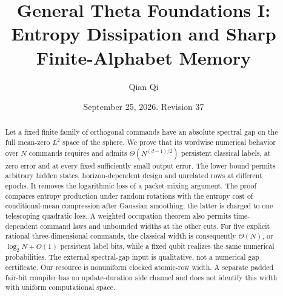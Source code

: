 \documentclass[11pt]{amsart}
\title[Entropy dissipation and finite-alphabet memory]{General Theta Foundations I:\\
Entropy Dissipation and Sharp Finite-Alphabet Memory}
\author{Qian Qi}
\date{September 25, 2026. Revision 37}
\theoremstyle{definition}\newtheorem{definition}[theorem]{Definition}
\theoremstyle{remark}\newtheorem{remark}[theorem]{Remark}
\begin{document}
\begin{abstract}
Let a fixed finite family of orthogonal commands have an absolute spectral
gap on the full mean-zero $L^2$ space of the sphere. We prove that its
wordwise numerical behavior over $N$ commands requires and admits
$\Theta(N^{(d-1)/2})$ persistent classical labels, at zero error and at
every fixed sufficiently small output error. The lower bound permits
arbitrary hidden states, horizon-dependent design and unrelated rows at
different epochs. It removes the logarithmic loss of a packet-mixing
argument. The proof compares entropy production under random rotations
with the entropy cost of conditional-mean compression after Gaussian
smoothing; the latter is charged to one telescoping quadratic loss.
A weighted occupation theorem also permits time-dependent command laws
and unbounded widths at the other cuts. For five explicit rational
three-dimensional commands, the classical width is consequently
$\Theta(N)$, or $\log_2N+O(1)$ persistent label bits, while a fixed qubit
realizes the same numerical probabilities. The external spectral-gap
input is qualitative, not a numerical gap certificate. Our resource is
nonuniform clocked atomic-row width. A separate padded fair-bit compiler
has no update-duration side channel and does not identify this width
with uniform computational space.
\end{abstract}
\maketitle







\appendix


\end{document}
